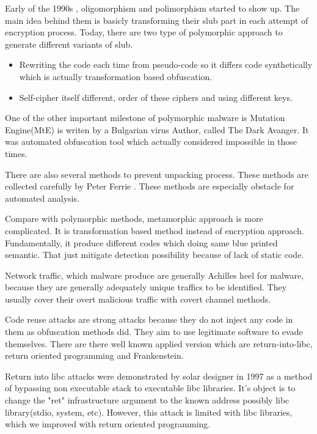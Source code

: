 Early of the 1990s , oligomorphism and polimorphism started to show up\cite{you2010malware}. The main idea behind them is basicly transforming their slub part in each attempt of encryption process\cite{nachenberg1996understanding}. Today, there are two type of  polymorphic approach to generate different variants of slub.\cite{li2011mechanisms}
\begin{itemize}
  \item Rewriting the code each time from pseudo-code so it differs code synthetically which is actually transformation based obfuscation.
  \item Self-cipher itself different, order of these ciphers and using different keys.
\end{itemize}
One of the other important milestone of polymorphic malware is Mutation Engine(MtE) is writen by a Bulgarian virus Author, called The Dark Avanger. It was automated obfuscation tool which actually considered impossible in those times.\cite{anonymous1}

There are also several methods to prevent unpacking process. These methods are collected carefully by Peter Ferrie \cite{ferrie2008anti}. These methods are especially obstacle for automated analysis.

Compare with polymorphic methods, metamorphic approach is more complicated. It is transformation based method instead of encryption  approach.\cite{konstantinou2008metamorphic} Fundamentally, it produce different codes which doing same blue printed semantic. That just mitigate detection possibility because of lack of static code. 

Network traffic, which malware produce are generally Achilles heel for malware, because they are generally adequately unique traffics to be identified\cite{marpaung2012survey}. They usually cover their overt malicious traffic with covert channel methods.\cite{rutkowska2006rootkits}

Code reuse attacks are strong attacks because they do not inject any code in them as obfuscation methods did. They aim to use legitimate software to evade themselves. There are there well known applied version which are return-into-libc, return oriented programming and Frankenstein.

Return into libc attacks were demonstrated by solar designer in 1997 as a method of bypassing non executable stack to executable libc libraries\cite{designer1997getting}. It's object is to change the "ret" infrastructure argument to the known address possibly libc library(stdio, system, etc). However, this attack is limited with libc libraries, which we improved with return oriented programming. 

